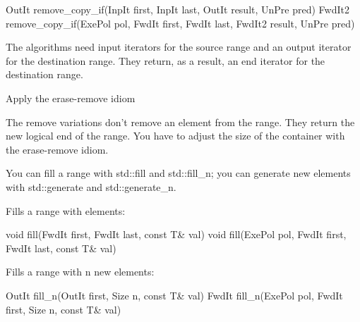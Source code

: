 \begin{cpp}
OutIt remove_copy_if(InpIt first, InpIt last, OutIt result, UnPre pred)
FwdIt2 remove_copy_if(ExePol pol, FwdIt first, FwdIt last,
						FwdIt2 result, UnPre pred)
\end{cpp}

The algorithms need input iterators for the source range and an output iterator for the destination range. They return, as a result, an end iterator for the destination range.

\begin{myWarning}{Apply the erase-remove idiom}
	
The remove variations don’t remove an element from the range. They return the new logical end of the range. You have to adjust the size of the container with the erase-remove idiom.


\end{myWarning}


You can fill a range with std::fill and std::fill\_n; you can generate new elements with std::generate and std::generate\_n.

Fills a range with elements:

\begin{cpp}
void fill(FwdIt first, FwdIt last, const T& val)
void fill(ExePol pol, FwdIt first, FwdIt last, const T& val)
\end{cpp}

Fills a range with n new elements:

\begin{cpp}
OutIt fill_n(OutIt first, Size n, const T& val)
FwdIt fill_n(ExePol pol, FwdIt first, Size n, const T& val)
\end{cpp}

